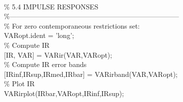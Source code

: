\hspace{1mm}\hspace{5mm} \hspace{5mm}  \\ 
\hspace{1mm}\hspace{5mm} \hspace{5mm} \textcolor{matlabgreen}{\% 5.4 IMPULSE RESPONSES }\\ 
\hspace{1mm}\hspace{5mm} \hspace{5mm} \textcolor{matlabgreen}{\%--------------------------------------------------------------------------  }\\ 
\hspace{1mm}\hspace{5mm} \hspace{5mm} \textcolor{matlabgreen}{\% For zero contemporaneous restrictions set: }\\ 
\hspace{1mm}\hspace{5mm} \hspace{5mm} VARopt.ident = \textcolor{matlabpurple}{'long'}; \\ 
\hspace{1mm}\hspace{5mm} \hspace{5mm} \textcolor{matlabgreen}{\% Compute IR }\\ 
\hspace{1mm}\hspace{5mm} \hspace{5mm} [IR, VAR] = VARir(VAR,VARopt); \\ 
\hspace{1mm}\hspace{5mm} \hspace{5mm} \textcolor{matlabgreen}{\% Compute IR error bands }\\ 
\hspace{1mm}\hspace{5mm} \hspace{5mm} [IRinf,IRsup,IRmed,IRbar] = VARirband(VAR,VARopt); \\ 
\hspace{1mm}\hspace{5mm} \hspace{5mm} \textcolor{matlabgreen}{\% Plot IR }\\ 
\hspace{1mm}\hspace{5mm} \hspace{5mm} VARirplot(IRbar,VARopt,IRinf,IRsup); \\ 
